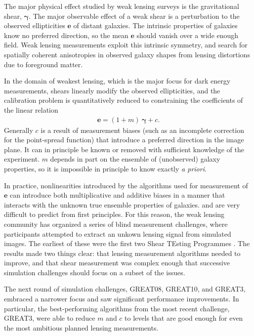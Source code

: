 \documentclass[iop]{emulateapj}
\begin{document}
The major physical effect studied by weak lensing surveys is the
gravitational shear, $\boldsymbol{\gamma}$. The major observable
effect of a weak shear is a perturbation to the observed ellipticities
$\boldsymbol{e}$ of distant galaxies. The intrinsic properties of
galaxies know no preferred direction, so the mean $\boldsymbol{e}$
should vanish over a wide enough field. Weak lensing measurements
exploit this intrinsic symmetry, and search for spatially coherent
anisotropies in observed galaxy shapes from lensing distortions due to
foreground matter.

In the domain of weakest lensing, which is the major focus for
dark energy measurements, shears linearly modify the observed
ellipticities, and the calibration problem is quantitatively reduced
to constraining the coefficients of the linear relation
\begin{align}
\boldsymbol{e} = (1+m)\:\boldsymbol{\gamma} + c.
\end{align}
Generally $c$ is a result of measurement biases (such as an incomplete
correction for the point-spread function) that introduce a preferred
direction in the image plane. It can in principle be known or removed
with sufficient knowledge of the experiment. $m$ depends in part on
the ensemble of (unobserved) galaxy properties, so it is impossible in
principle to know exactly {\it a priori}.

In practice, nonlinearities introduced by the algorithms used for
measurement of $\boldsymbol{e}$ can introduce both multiplicative and
additive biases in a manner that interacts with the unknown true
ensemble properties of galaxies. and are very difficult to predict
from first principles. For this reason, the weak lensing community has
organized a series of blind measurement challenges, where participants
attempted to extract an unkown lensing signal from simulated images.
The earliest of these were the first two Shear TEsting Programmes
\citep[STEP1, STEP2]{2006MNRAS.368.1323H,2007MNRAS.376...13M}. The
results made two things clear: that lensing measurement algorithms
needed to improve, and that shear measurement was complex enough that
successive simulation challenges should focus on a subset of the
issues.

The next round of simulation challenges, GREAT08, GREAT10, and GREAT3,
\citep{2009AnApS...3....6B,2013ApJS..205...12K, 2015MNRAS.450.2963M}
embraced a narrower focus and saw significant performance
improvements. In particular, the best-performing algorithms from the
most recent challenge, GREAT3, were able to reduce $m$ and $c$ to
levels that are good enough for even the most ambitious planned
lensing measurements.
\end{document}
